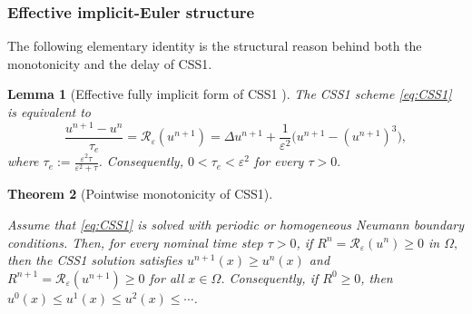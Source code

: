 \documentclass[final, 3p, times]{elsarticle}%
\newcommand{\eps}{\varepsilon}
\newcommand{\Reps}{\mathcal R_\varepsilon}
\newtheorem{theorem}{Theorem}[section]
\newtheorem{lemma}[theorem]{Lemma}
\begin{document}
\subsubsection{Effective implicit-Euler structure}

The following elementary identity is the structural reason behind both the monotonicity and
the delay of CSS1.

\begin{lemma}[Effective fully implicit form of CSS1 \cite{tangqiao2020phasefield,xu2019stability}]
\label{lem:CSS1-effective-step}
The CSS1 scheme \eqref{eq:CSS1} is equivalent to
\begin{equation}
    \frac{u^{n+1}-u^n}{\tau_e} =
    \Reps(u^{n+1})=
    \Delta u^{n+1}
    +\frac{1}{\eps^2}\bigl(u^{n+1}-(u^{n+1})^3\bigr),
    \label{eq:CSS1-effective-IE}
\end{equation}
where $\tau_e:=\frac{\eps^2\tau}{\eps^2+\tau}$.
Consequently, $0<\tau_e<\eps^2$ for every $\tau>0.$
\end{lemma}

\begin{theorem}[Pointwise monotonicity of CSS1]
\label{thm:CSS1-monotonicity}

Assume that \eqref{eq:CSS1} is solved with periodic or homogeneous Neumann boundary conditions. Then, for every nominal time step $\tau>0$, if $R^{n}=\Reps(u^{n})\ge0$ in $\Omega,$
then the CSS1 solution satisfies $u^{n+1}(x)\ge u^n(x)$ and $R^{n+1}=\Reps(u^{n+1})\ge0$ for all $x\in\Omega$.
Consequently, if $R^0\ge0$, then $u^0(x)\le u^1(x)\le u^2(x)\le\cdots$.
\end{theorem}
\end{document}
